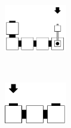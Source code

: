 \begin{figure}[H]
\begin{minipage}[b]{.64\textwidth}
        \begin{subfigure}[t]{0.3\textwidth}
            \centering
            \includegraphics[width=0.3\textwidth]{return_paths_read_next_3_seed}
            \caption{\label{fig:read_next_3_seed}}
        \end{subfigure}%
        ~
        \begin{subfigure}[t]{0.3\textwidth}
            \centering
            \includegraphics[width=0.3\textwidth]{return_paths_read_next_2_seed}
            \caption{\label{fig:read_next_2_seed}}
        \end{subfigure}%
        ~
    \end{minipage}%
    \begin{minipage}[b]{.35\textwidth}
      \centering
      \begin{subfigure}[t]{\textwidth}
        \centering

\end{subfigure}
\end{minipage}
\end{figure}
